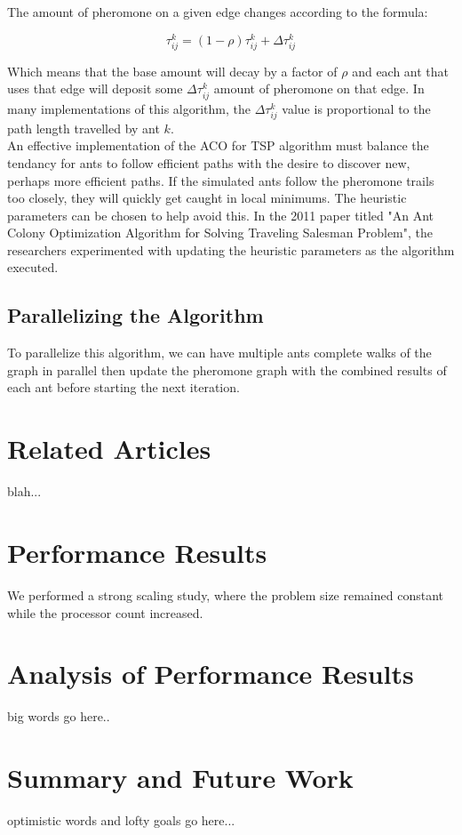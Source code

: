 \documentclass[twocolumn]{article}
\begin{document}
The amount of pheromone on a given edge changes according to the formula:

{\large\begin{equation}\tau^k_{ij}=(1-\rho)\tau^k_{ij}+\Delta\tau^k_{ij}
\end{equation}} 

Which means that the base amount will decay by a factor of $\rho$ and each ant
that uses that edge will deposit some $\Delta\tau^k_{ij}$ amount of pheromone on
that edge. In many implementations of this algorithm, the $\Delta\tau^k_{ij}$
value is proportional to the path length travelled by ant $k$. \\

An effective implementation of the ACO for TSP algorithm must balance the 
tendancy for ants to follow efficient paths with the desire to discover new,
perhaps more efficient paths. If the simulated ants follow the pheromone trails
too closely, they will quickly get caught in local minimums. The heuristic 
parameters can be chosen to help avoid this. In the 2011 paper titled "An Ant
Colony Optimization Algorithm for Solving Traveling Salesman Problem", the 
researchers experimented with updating the heuristic parameters as the algorithm
executed. \\

\subsection{Parallelizing the Algorithm}

To parallelize this algorithm, we can have multiple ants complete walks of the
graph in parallel then update the pheromone graph with the combined results of
each ant before starting the next iteration.  \\







\section{Related Articles}

blah...\\


\section{Performance Results}

We performed a strong scaling study, where the problem size remained constant
while the processor count increased.\\


\section{Analysis of Performance Results}

big words go here..\\


\section{Summary and Future Work}

optimistic words and lofty goals go here...\\
\end{document}

